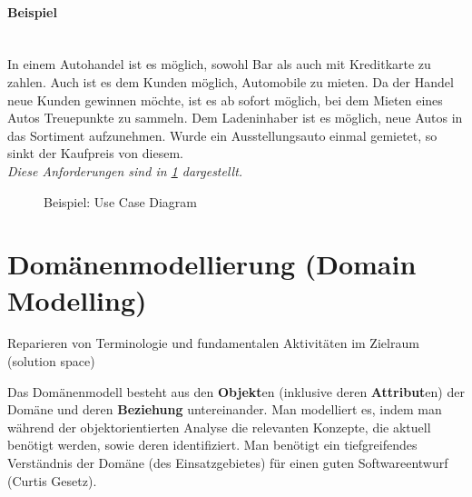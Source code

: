 \documentclass[ngerman,color=3b]{tuda_summary}
\begin{document}
\paragraph{Beispiel}\mbox{}\\
In einem Autohandel ist es möglich, sowohl Bar als auch mit Kreditkarte zu zahlen. Auch ist es dem Kunden möglich, Automobile zu mieten. Da der Handel neue Kunden gewinnen möchte, ist es ab sofort möglich, bei dem Mieten eines Autos Treuepunkte zu sammeln. Dem Ladeninhaber ist es möglich, neue Autos in das Sortiment aufzunehmen. Wurde ein Ausstellungsauto einmal gemietet, so sinkt der Kaufpreis von diesem. \\ \textit{Diese Anforderungen sind in \figurename{} \ref{fig:usecase} dargestellt.}
\begin{figure}[ht]
    \centering
    \caption{Beispiel: Use Case Diagram}
    \label{fig:usecase}
\end{figure}

\FloatBarrier{}
\section{Domänenmodellierung (Domain Modelling)}
\begin{definition}
    Reparieren von Terminologie und fundamentalen Aktivitäten im Zielraum (solution space)
\end{definition}
\begin{definition}
    Das Domänenmodell besteht aus den \textbf{Objekt}en (inklusive deren \textbf{Attribut}en) der Domäne und deren  \textbf{Beziehung}  untereinander.
    Man modelliert es, indem man während der objektorientierten Analyse die relevanten Konzepte, die aktuell benötigt werden, sowie deren identifiziert. Man benötigt ein tiefgreifendes Verständnis der Domäne (des Einsatzgebietes) für einen guten Softwareentwurf (Curtis Gesetz).
\end{definition}
\end{document}
